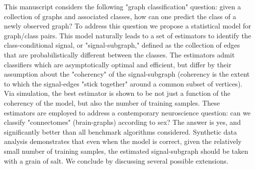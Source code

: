 This manuscript considers the following "graph classification" question: given a collection of graphs and associated classes, how can one predict the class of a newly observed graph?  To address this question we propose a statistical model for graph/class pairs.  This model naturally leads to a set of estimators to identify the class-conditional signal, or "signal-subgraph," defined as the collection of edges that are probabilistically different between the classes. The estimators admit classifiers which are asymptotically optimal and efficient, but differ by their assumption about the "coherency" of the signal-subgraph (coherency is the extent to which the signal-edges "stick together" around a common subset of vertices). Via simulation, the best estimator is shown to be not just a function of the coherency of the model, but also the number of training samples.  These estimators are employed to address a contemporary neuroscience question: can we classify "connectomes" (brain-graphs) according to sex?  The answer is yes, and significantly better than all benchmark algorithms considered.  Synthetic data analysis demonstrates that even when the model is correct, given the relatively small number of training samples, the estimated signal-subgraph should be taken with a grain of salt.  We conclude by discussing several possible extensions.
